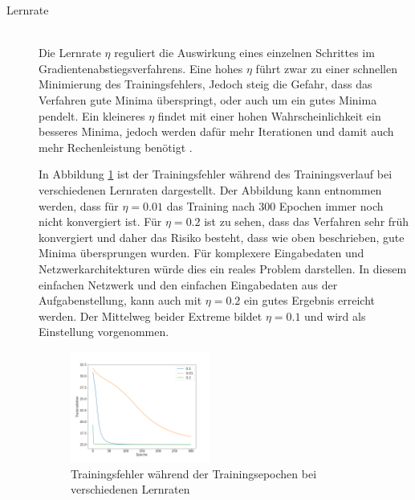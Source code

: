 \begin{description}
	\item[Lernrate]\hfill \\
	Die Lernrate $\eta$ reguliert die Auswirkung eines einzelnen Schrittes im Gradientenabstiegsverfahrens. Eine hohes $\eta$ führt zwar zu einer schnellen Minimierung des Trainingsfehlers, Jedoch steig die Gefahr, dass das Verfahren gute Minima überspringt, oder auch um ein gutes Minima pendelt. Ein kleineres $\eta$ findet mit einer hohen Wahrscheinlichkeit ein besseres Minima, jedoch werden dafür mehr Iterationen und damit auch mehr Rechenleistung benötigt \cite{neuronalenetze}.
	
	In Abbildung \ref*{fig:learning_rates} ist der Trainingsfehler während des Trainingsverlauf bei verschiedenen Lernraten dargestellt. Der Abbildung kann entnommen werden, dass für $\eta=0.01$ das Training nach 300 Epochen immer noch nicht konvergiert ist. Für $\eta=0.2$ ist zu sehen, dass das Verfahren sehr früh konvergiert und daher das Risiko besteht, dass wie oben beschrieben, gute Minima übersprungen wurden. Für komplexere Eingabedaten und Netzwerkarchitekturen würde dies ein reales Problem darstellen. In diesem einfachen Netzwerk und den einfachen Eingabedaten aus der Aufgabenstellung, kann auch mit $\eta=0.2$ ein gutes Ergebnis erreicht werden. Der Mittelweg beider Extreme bildet $\eta=0.1$ und wird als Einstellung vorgenommen.
	
	\begin{figure}[ht]
		\centering
		\includegraphics[width = 0.45\textwidth]{Bilder/learning_rates.png}
		\caption{Trainingsfehler während der Trainingsepochen bei verschiedenen Lernraten}
		\label{fig:learning_rates}
	\end{figure}
	

\end{description}
